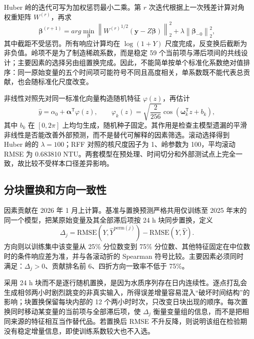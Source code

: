 \documentclass[UTF8,12pt,a4paper]{ctexart}
\begin{document}
Huber 岭的迭代可写为加权惩罚最小二乘。第 $r$ 次迭代根据上一次残差计算对角权重矩阵 $W^{(r)}$，再求
\begin{equation}
\boldsymbol\beta^{(r+1)}=arg\min_{\boldsymbol\beta}
\left\|{W^{(r)}}^{1/2}(\boldsymbol y-Z\boldsymbol\beta)\right\|_2^2
+\lambda\left\|\boldsymbol\beta_{-0}\right\|_2^2,
\label{eq:huber-ridge-objective}
\end{equation}
其中截距不受惩罚。所有响应计算均在 $\log(1+Y)$ 尺度完成，反变换后截断为非负值。岭项不是为了制造稀疏系数，而是稳定 59 个当前项与滞后项间的共线设计；主要因素的选择另由组置换完成。因此，不能简单按单个标准化系数绝对值排序：同一原始变量的五个时间项可能符号不同且高度相关，单系数既不能代表总贡献，也会随标准化尺度改变。

非线性对照先对同一标准化向量构造随机特征 $\varphi(z)$，再估计
\begin{equation}
\widehat y=\alpha_0+\boldsymbol\alpha^{\mathsf T}\varphi(z),\qquad
\varphi_k(z)=\sqrt{\frac{2}{256}}\cos(\boldsymbol\omega_k^{\mathsf T}z+b_k),
\end{equation}
其中 $b_k$ 在 $[0,2\pi]$ 上均匀生成，随机种子固定。其作用是检查主模型遗漏的平滑非线性是否能改善外部预测，而不是替代可解释的因素筛选。滚动选择得到 Huber 岭的 $\lambda=100$；RFF 对照的核尺度因子为 1、岭参数为 100，平均滚动 RMSE 为 0.683810 NTU。两套模型在预处理、时间切分和外部测试点上完全一致，故比较不受样本口径差异影响。

\subsection{分块置换和方向一致性}

因素贡献在 2026 年 1 月上计算。基准与置换预测严格共用仅训练至 2025 年末的同一个模型，把某原始变量及其全部滞后项按 24 h 块同步置换，定义
\begin{equation}
\Delta_j=\mathrm{RMSE}(Y,\widehat Y^{\mathrm{perm}(j)})-\mathrm{RMSE}(Y,\widehat Y).
\label{eq:perm}
\end{equation}
方向则以训练集中该变量从 25\% 分位数变到 75\% 分位数、其他特征固定在中位数时的条件响应差为准，并与各滚动折的 Spearman 符号比较。主要因素必须同时满足：$\Delta_j>0$、贡献排名前 6、四折方向一致率不低于 75\%。

采用 24 h 块而不是逐行随机置换，是因为水质序列存在日内连续性。逐点打乱会生成相邻两小时剧烈跳变的非真实输入，所得误差增量容易混入“破坏时间结构”的影响；块置换保留每块内部的 12 个两小时时次，只改变日块出现的顺序。每次置换同时移动某变量的当前项与全部滞后项，使 $\Delta_j$ 衡量变量组的信息，而不是把相同来源的特征相互当作替代品。若置换后 RMSE 不升反降，则说明该组在检验期没有稳定增量信息，即使训练系数较大也不入选。
\end{document}
